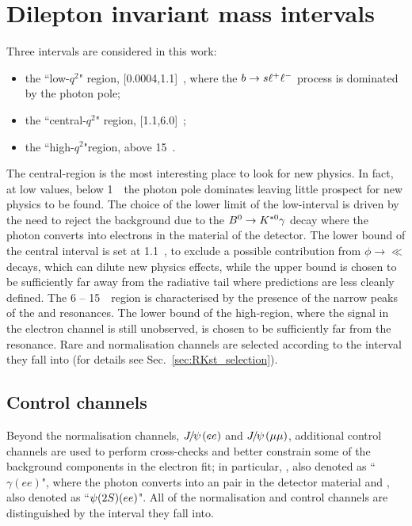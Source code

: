 \section{Dilepton invariant mass intervals}
\label{sec:RKst_q2_choice}

Three \qsq intervals are considered in this work: 
\begin{itemize}
\item the ``low-$q^2$" region, [0.0004,1.1]~\gevgevcccc, where the ${b}\rightarrow{\ensuremath{s}}\ell^+ \ell^-$ process is dominated by the photon pole;
\item the ``central-$q^2$" region, [1.1,6.0]~\gevgevcccc;
\item the ``high-$q^2$"region, above 15~\gevgevcccc.
\end{itemize}
%
The central-\qsq region is the most interesting place to look for new physics. In fact, at low \qsq values, below 
1~\gevgevcccc~the photon pole dominates leaving little prospect for new physics to be found. %
The choice of the lower limit of the low-\qsq interval is driven by the need to reject the background due to the 
${{B}^0}\rightarrow{\ensuremath{{K}^{*0}}}\gamma$ decay where the photon converts into electrons in the material of the detector.
The lower bound of the central interval is set at 1.1~\gevgevcccc, to exclude a possible contribution from $\phi\to\ll$ decays, 
which can dilute new physics effects, while the upper bound is chosen to be sufficiently far away from the \jpsi radiative
tail where predictions are less cleanly defined. The 6 -- 15~\gevgevcccc~region is characterised by the presence
of the narrow peaks of the \jpsi and \psitwos resonances. The lower bound of the high-\qsq region, where
the signal in the electron channel is still unobserved, is chosen to be sufficiently far from the \psitwos resonance.
Rare and normalisation channels are selected according to the \qsq interval they fall into (for details see Sec.~\ref{sec:RKst_selection}).

\subsection{Control channels}
Beyond the normalisation channels, $\jpsi(ee)$ and $\jpsi(\mu\mu)$, additional control channels
are used to perform cross-checks and better constrain some of the background components
in the electron fit; in particular, \BdToKstGee, also denoted as ``$\gamma (ee)$", where the photon 
converts into an \ee pair in the detector material and \BdToKstPsiee, also denoted as ``$\psitwos(ee)$".
All of the normalisation and control channels are distinguished by the \qsq interval
they fall into. %


